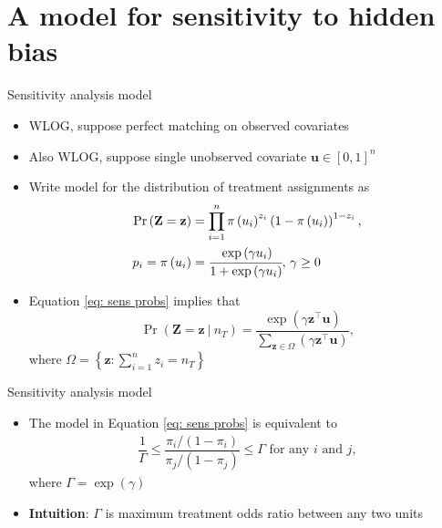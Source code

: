 \documentclass[table, xcolor={dvipsnames}, 9pt]{beamer}
\newcommand\given[1][]{\:#1\vert\:}
\theoremstyle{newstyle}
\begin{document}
\section{A model for sensitivity to hidden bias}
\begin{frame}{Sensitivity analysis model}
\vfill
\begin{itemize}
\item WLOG, suppose perfect matching on observed covariates
\item Also WLOG, suppose single unobserved covariate $\bm{u} \in [0, 1]^n$ \\ \citep[][p. 300, footnote 33]{rosenbaum2017}  \vfill
\item Write model for the distribution of treatment assignments as  \vfill
\begin{align} 
\Pr\left(\mathbf{Z} = \mathbf{z}\right) & = \prod \limits_{i = 1}^n \pi\left(u_i\right)^{z_i} \left(1 - \pi\left(u_i\right)\right)^{1 - z_i}, \\
p_i = \pi\left(u_i\right) & = \cfrac{\exp\left(\gamma u_i\right)}{1 + \exp\left(\gamma u_i\right)}, \, \gamma \geq 0 \label{eq: sens probs}
\end{align} \vfill
\item  Equation \eqref{eq: sens probs} implies that \vfill
\begin{equation}
\Pr\left(\bm{Z} = \bm{z} \given n_T\right) = \dfrac{\exp\left(\gamma \bm{z}^{\top} \bm{u}\right)}{\sum \limits_{\bm{z} \in \Omega} (\gamma \bm{z}^{\top} \bm{u})},
\end{equation} \vfill
where $\Omega = \left\{\bm{z}: \sum \limits_{i = 1}^n z_i = n_T\right\}$
\end{itemize}
\end{frame}
\begin{frame}{Sensitivity analysis model}
\vfill
\begin{itemize} \vfill
\item The model in Equation \eqref{eq: sens probs} is equivalent to \vfill
\begin{align*}
\dfrac{1}{\Gamma} \leq \dfrac{\pi_i / (1 - \pi_i)}{\pi_j / (1 - \pi_j)} \leq \Gamma \text{ for any } i \text{ and } j,
\end{align*} \vfill
where $\Gamma = \exp(\gamma)$ \citep[see][]{rosenbaum1995} \vfill
\item \textbf{Intuition}: $\Gamma$ is maximum treatment odds ratio between any two units \vfill
\end{itemize}
\end{frame}
\end{document}
